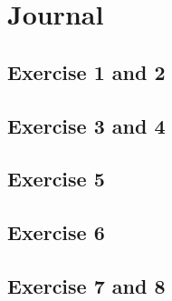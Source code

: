 \section{Journal}
\subsection{Exercise 1 and 2 }




\subsection{Exercise 3 and 4 }




\subsection{Exercise 5 }


\subsection{Exercise 6 }


\subsection{Exercise 7 and 8 }






